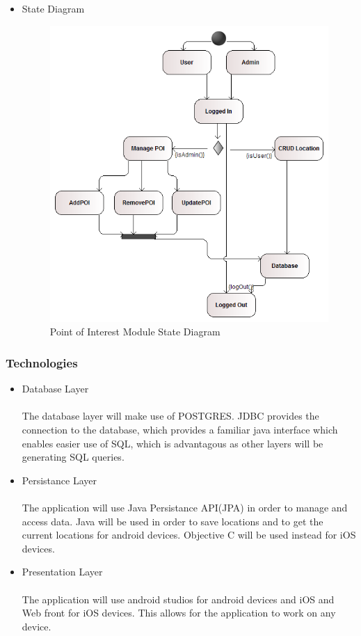 \documentclass{article}
\begin{document}
\begin{itemize}
 				\item State Diagram
 				\begin{center}
 					\begin{figure}[!h]
 						\includegraphics[scale=0.6]{POI_State_Machine_diagram.png}
 						\caption{Point of Interest Module State Diagram}
 					\end{figure}
 				\end{center}
 		\end{itemize}
 				
 		\subsubsection{Technologies}
 		\begin{itemize}
 			\item Database Layer
 			\\
 			\\
	 		The database layer will make use of POSTGRES. JDBC provides the connection to the database, which provides a familiar java interface which enables easier use of SQL, which is 	advantagous as other layers will be generating SQL queries.
	 		
	 		\item Persistance Layer
	 		\\
	 		\\
	 		The application will use Java Persistance API(JPA) in order to manage and access data.
	 		Java will be used in order to save locations and to get the current locations for android devices.
	 		Objective C will be used instead for iOS devices.
	 		\item Presentation Layer
	 		\\
	 		\\
	 		The application will use android studios for android devices and iOS and Web front for iOS devices. This allows for the application to work on any device.
				
				
			\end{itemize}
\end{document}
